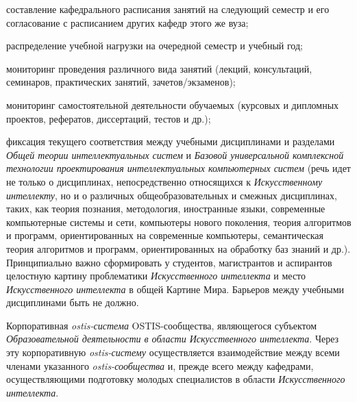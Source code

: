 {\begin{scnitemize}
    \begin{scnitemizeii}
        \item составление кафедрального расписания занятий на следующий семестр и его согласование с расписанием других кафедр этого же вуза;
        \item распределение учебной нагрузки на очередной семестр и учебный год;
        \item мониторинг проведения различного вида занятий (лекций, консультаций, семинаров, практических занятий, зачетов/экзаменов);
        \item мониторинг самостоятельной деятельности обучаемых (курсовых и дипломных проектов, рефератов, диссертаций, тестов и др.);
        \item фиксация текущего соответствия между учебными дисциплинами и разделами \textit{Общей теории интеллектуальных систем} и \textit{Базовой универсальной комплексной технологии проектирования интеллектуальных компьютерных систем} (речь идет не только о дисциплинах, непосредственно относящихся к \textit{Искусственному интеллекту}, но и о различных общеобразовательных и смежных дисциплинах, таких, как теория познания, методология, иностранные языки, современные компьютерные системы и сети, компьютеры нового поколения, теория алгоритмов и программ, ориентированных на современные компьютеры, семантическая теория алгоритмов и программ, ориентированных на обработку баз знаний и др.). Принципиально важно сформировать у студентов, магистрантов и аспирантов целостную картину проблематики \textit{Искусственного интеллекта} и место \textit{Искусственного интеллекта} в общей Картине Мира. Барьеров между учебными дисциплинами быть не должно.
    \end{scnitemizeii}
    \item Корпоративная \textit{ostis-система} OSTIS-сообщества, являющегося субъектом \textit{Образовательной деятельности в области Искусственного интеллекта}. Через эту корпоративную \textit{ostis-систему} осуществляется взаимодействие между всеми членами указанного \textit{\mbox{ostis-сообщества}} и, прежде всего между кафедрами, осуществляющими подготовку молодых специалистов в области \textit{Искусственного интеллекта}.
\end{scnitemize}}

